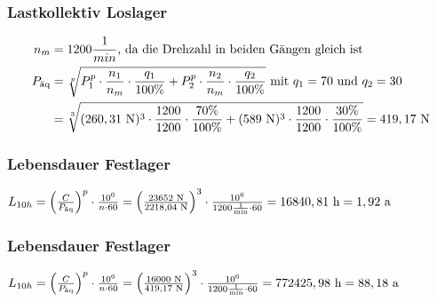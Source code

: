 \subsubsection{Lastkollektiv Loslager}
\begin{align*}
	n_m &= 1200 \frac{1}{min} \text{, da die Drehzahl in beiden Gängen gleich ist} \\
	P_{\text{äq}} &= \sqrt[p]{P_1 ^{p} \cdot \frac{n_1}{n_m} \cdot \frac{q_1}{100\% } + P_2 ^{p} \cdot \frac{n_2}{n_m} \cdot \frac{q_2}{100 \%}} \text{ mit $q_1 = 70$ und $q_2= 30$} \\
	&= \sqrt[3]{(260,31 \text{ N}) ^{3} \cdot \frac{1200}{1200} \cdot \frac{70 \%}{100 \%} +(589 \text{ N}) ^{3} \cdot \frac{1200}{1200} \cdot \frac{30 \%}{100\% }} = 419,17 \text{ N}\\
\end{align*}

\subsubsection{Lebensdauer Festlager}
$L_{10h}= \left( \frac{C}{P_{\text{äq}}} \right) ^p \cdot \frac{10^6}{n \cdot 60} = \left( \frac{23652 \text{ N}}{2218,04 \text{ N}} \right) ^3 \cdot \frac{10^6}{1200 \frac{1}{\text{min}} \cdot 60} = 16840,81 \text{ h} = 1,92 \text{ a}$

\subsubsection{Lebensdauer Festlager}
$L_{10h}= \left( \frac{C}{P_{\text{äq}}} \right) ^p \cdot \frac{10^6}{n \cdot 60} = \left( \frac{16000 \text{ N}}{419,17 \text{ N}} \right) ^3 \cdot \frac{10^6}{1200 \frac{1}{\text{min}} \cdot 60} = 772425,98 \text{ h} = 88,18 \text{ a}$